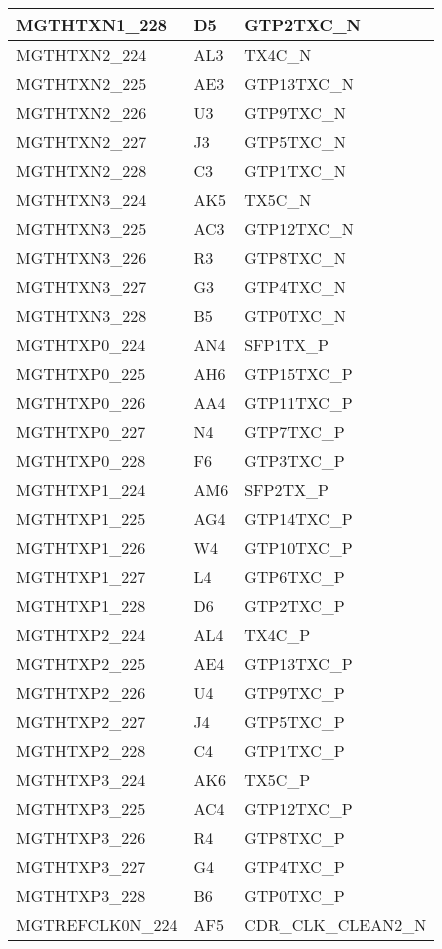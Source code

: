 \begin{footnotesize}
\begin{longtable}{|p{7cm}|p{1cm}|p{5cm}|}
MGTHTXN1\_228	&	D5	&	GTP2TXC\_N	\\ \hline
MGTHTXN2\_224	&	AL3	&	TX4C\_N	\\ \hline
MGTHTXN2\_225	&	AE3	&	GTP13TXC\_N	\\ \hline
MGTHTXN2\_226	&	U3	&	GTP9TXC\_N	\\ \hline
MGTHTXN2\_227	&	J3	&	GTP5TXC\_N	\\ \hline
MGTHTXN2\_228	&	C3	&	GTP1TXC\_N	\\ \hline
MGTHTXN3\_224	&	AK5	&	TX5C\_N	\\ \hline
MGTHTXN3\_225	&	AC3	&	GTP12TXC\_N	\\ \hline
MGTHTXN3\_226	&	R3	&	GTP8TXC\_N	\\ \hline
MGTHTXN3\_227	&	G3	&	GTP4TXC\_N	\\ \hline
MGTHTXN3\_228	&	B5	&	GTP0TXC\_N	\\ \hline
MGTHTXP0\_224	&	AN4	&	SFP1TX\_P	\\ \hline
MGTHTXP0\_225	&	AH6	&	GTP15TXC\_P	\\ \hline
MGTHTXP0\_226	&	AA4	&	GTP11TXC\_P	\\ \hline
MGTHTXP0\_227	&	N4	&	GTP7TXC\_P	\\ \hline
MGTHTXP0\_228	&	F6	&	GTP3TXC\_P	\\ \hline
MGTHTXP1\_224	&	AM6	&	SFP2TX\_P	\\ \hline
MGTHTXP1\_225	&	AG4	&	GTP14TXC\_P	\\ \hline
MGTHTXP1\_226	&	W4	&	GTP10TXC\_P	\\ \hline
MGTHTXP1\_227	&	L4	&	GTP6TXC\_P	\\ \hline
MGTHTXP1\_228	&	D6	&	GTP2TXC\_P	\\ \hline
MGTHTXP2\_224	&	AL4	&	TX4C\_P	\\ \hline
MGTHTXP2\_225	&	AE4	&	GTP13TXC\_P	\\ \hline
MGTHTXP2\_226	&	U4	&	GTP9TXC\_P	\\ \hline
MGTHTXP2\_227	&	J4	&	GTP5TXC\_P	\\ \hline
MGTHTXP2\_228	&	C4	&	GTP1TXC\_P	\\ \hline
MGTHTXP3\_224	&	AK6	&	TX5C\_P	\\ \hline
MGTHTXP3\_225	&	AC4	&	GTP12TXC\_P	\\ \hline
MGTHTXP3\_226	&	R4	&	GTP8TXC\_P	\\ \hline
MGTHTXP3\_227	&	G4	&	GTP4TXC\_P	\\ \hline
MGTHTXP3\_228	&	B6	&	GTP0TXC\_P	\\ \hline
MGTREFCLK0N\_224	&	AF5	&	CDR\_CLK\_CLEAN2\_N	\\ \hline

\end{longtable}
\end{footnotesize}
